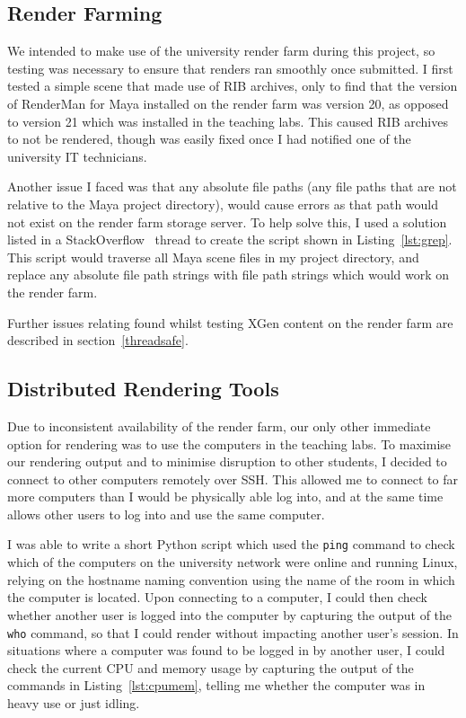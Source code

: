 \documentclass[11pt]{article}
\begin{document}
\subsection{Render Farming}

We intended to make use of the university render farm during this project, so testing was necessary to ensure that renders ran smoothly once submitted. I first tested a simple scene that made use of RIB archives, only to find that the version of RenderMan for Maya installed on the render farm was version 20, as opposed to version 21 which was installed in the teaching labs. This caused RIB archives to not be rendered, though was easily fixed once I had notified one of the university IT technicians.

Another issue I faced was that any absolute file paths (any file paths that are not relative to the Maya project directory), would cause errors as that path would not exist on the render farm storage server. To help solve this, I used a solution listed in a StackOverflow~\cite{stackoverflow} thread to create the script shown in Listing~\ref{lst:grep}. This script would traverse all Maya scene files in my project directory, and replace any absolute file path strings with file path strings which would work on the render farm.

Further issues relating found whilst testing XGen content on the render farm are described in section~\ref{threadsafe}.

\subsection{Distributed Rendering Tools}

Due to inconsistent availability of the render farm, our only other immediate option for rendering was to use the computers in the teaching labs. To maximise our rendering output and to minimise disruption to other students, I decided to connect to other computers remotely over SSH. This allowed me to connect to far more computers than I would be physically able log into, and at the same time allows other users to log into and use the same computer.

I was able to write a short Python script which used the \texttt{ping} command to check which of the computers on the university network were online and running Linux, relying on the hostname naming convention using the name of the room in which the computer is located. Upon connecting to a computer, I could then check whether another user is logged into the computer by capturing the output of the \texttt{who} command, so that I could render without impacting another user's session. In situations where a computer was found to be logged in by another user, I could check the current CPU and memory usage by capturing the output of the commands in Listing~\ref{lst:cpumem}, telling me whether the computer was in heavy use or just idling.
\end{document}
